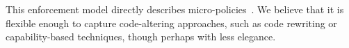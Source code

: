 \documentclass[acmsmall,review,anonymous]{acmart}\settopmatter{printfolios=true,printccs=false,printacmref=false}
\begin{document}

This enforcement model directly describes micro-policies~\citep{pump_oakland2015}.
We believe that it is flexible enough to capture code-altering approaches, such as code
rewriting or capability-based techniques, though perhaps with less elegance.

\newcommand{\TAGS}{\mathcal{T}}
\newcommand{\tagname}{t}
\newcommand{\uP}{{\mu P}}

%


\end{document}
